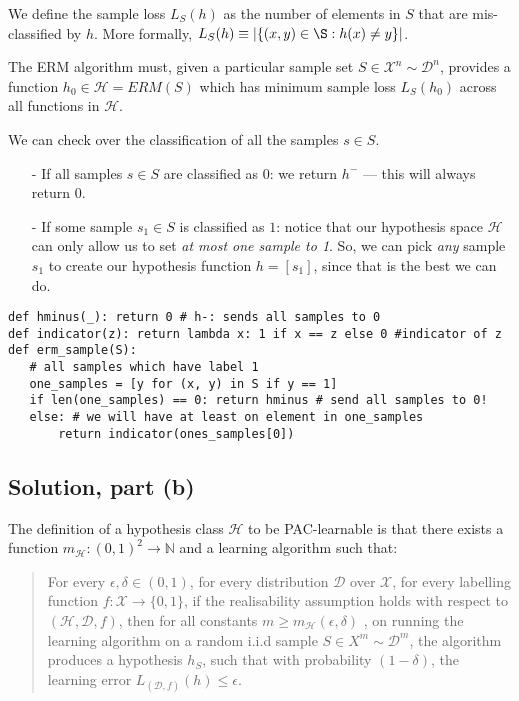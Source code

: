 \documentclass[11pt]{article}
\newcommand{\D}{\ensuremath{\mathcal{D}}}
\renewcommand{\H}{\ensuremath{\mathcal{H}}}
\newcommand{\X}{\ensuremath{\mathcal{X}}}
\begin{document}
We define the sample loss $L_S(h)$ as the number of elements in $S$
that are mis-classified by $h$. More formally,
$L_S(h) \equiv |\{ (x, y) \in \S : h(x) \neq  y \}|$.

The ERM algorithm must, given a particular sample set $S \in \X^n \sim \D^n$,
provides a function $h_0 \in \H = ERM(S)$ which has minimum sample loss
$L_S(h_0)$ across all functions in $\H$.

We can check over the classification of all the samples $s \in S$.
\begin{itemize}
    \item[-] If all samples $s \in S $ are classified as $0$:
        we return $h^-$ --- this will always return $0$.
    \item[-] If some sample $s_1 \in S$ is classified as $1$: notice that
        our hypothesis space $\H$ can only allow us to set
        \emph{at most one sample to 1}. So, we can pick \emph{any} sample
        $s_1$ to create our hypothesis function $h = [s_1]$, since that
        is the best we can do.
\end{itemize}

\begin{verbatim}
def hminus(_): return 0 # h-: sends all samples to 0
def indicator(z): return lambda x: 1 if x == z else 0 #indicator of z
def erm_sample(S):
   # all samples which have label 1
   one_samples = [y for (x, y) in S if y == 1]
   if len(one_samples) == 0: return hminus # send all samples to 0!
   else: # we will have at least on element in one_samples
       return indicator(ones_samples[0])
\end{verbatim}


\subsection*{Solution, part (b)}

The definition of a hypothesis class $\H$ to be PAC-learnable is that there exists
a function $m_\H: (0, 1)^2 \rightarrow \mathbb N$ and a learning algorithm
such that:

\begin{quote}
For every $\epsilon, \delta \in (0, 1)$, for every distribution $\D$ over $\X$,
for every labelling function $f: \X \rightarrow \{0, 1\}$, if the realisability
assumption holds with respect to $(\H, \D, f)$, then for all constants
$m \geq m_\H(\epsilon, \delta)$ , on running the learning algorithm on
a random i.i.d sample $S \in X^m \sim \D^m$, the algorithm produces a hypothesis
$h_S$, such that with probability $(1 - \delta)$, the learning error 
$L_{(\D, f)}(h) \leq \epsilon$.
\end{quote}
\end{document}
